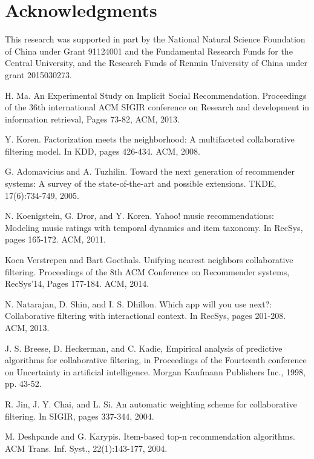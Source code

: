 \documentclass{llncs}
\begin{document}
	\section{Acknowledgments}
	This research was supported in part by the National Natural
Science Foundation of China under Grant 91124001 and  the Fundamental Research Funds for the Central University, and the Research Funds of Renmin University of China under grant 2015030273. 
	\begin{thebibliography}{[10]}
		H. Ma. An Experimental Study on Implicit Social Recommendation.
		Proceedings of the 36th international ACM SIGIR conference on Research and development in information retrieval, Pages 73-82, ACM, 2013.

        Y. Koren. Factorization meets the neighborhood: A
		multifaceted collaborative filtering model. In KDD, pages
		426-434. ACM, 2008.

		G. Adomavicius and A. Tuzhilin. Toward the next generation of recommender systems: A survey of the state-of-the-art and possible extensions. TKDE, 17(6):734-749, 2005.
		
        N. Koenigstein, G. Dror, and Y. Koren. Yahoo! music recommendations: Modeling music ratings with temporal dynamics and item taxonomy. In RecSys, pages 165-172. ACM, 2011.
		
       Koen Verstrepen and Bart Goethals. Unifying nearest neighbors collaborative filtering. Proceedings of the 8th ACM Conference on Recommender systems, RecSys'14, Pages 177-184. ACM, 2014.
		
		N. Natarajan, D. Shin, and I. S. Dhillon. Which app will you
		use next?: Collaborative filtering with interactional context.
		In RecSys, pages 201-208. ACM, 2013.
		
		J. S. Breese, D. Heckerman, and C. Kadie, Empirical analysis
		of predictive algorithms for collaborative filtering,  in Proceedings
		of the Fourteenth conference on Uncertainty in artificial intelligence.
		Morgan Kaufmann Publishers Inc., 1998, pp. 43-52.

		R. Jin, J. Y. Chai, and L. Si. An automatic weighting scheme
		for collaborative filtering. In SIGIR, pages 337-344, 2004.
		
		M. Deshpande and G. Karypis. Item-based top-n
		recommendation algorithms. ACM Trans. Inf. Syst.,
		22(1):143-177, 2004.
		

\end{thebibliography}
\end{document}
